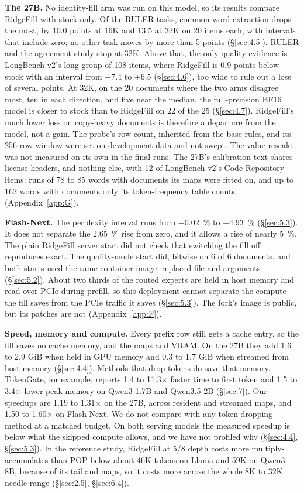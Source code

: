 \documentclass[11pt]{article}
\begin{document}
\textbf{The 27B.} No identity-fill arm was run on this model, so its results compare RidgeFill with stock only. Of the RULER tasks, common-word extraction drops the most, by 10.0 points at 16K and 13.5 at 32K on 20 items each, with intervals that include zero; no other task moves by more than 5 points (\S\ref{sec:4.5}). RULER and the agreement study stop at 32K. Above that, the only quality evidence is LongBench v2's long group of 108 items, where RidgeFill is 0.9 points below stock with an interval from $-$7.4 to +6.5 (\S\ref{sec:4.6}), too wide to rule out a loss of several points. At 32K, on the 20 documents where the two arms disagree most, ten in each direction, and five near the median, the full-precision BF16 model is closer to stock than to RidgeFill on 22 of the 25 (\S\ref{sec:4.7}). RidgeFill's much lower loss on copy-heavy documents is therefore a departure from the model, not a gain. The probe's row count, inherited from the base rules, and its 256-row window were set on development data and not swept. The value rescale was not measured on its own in the final runs. The 27B's calibration text shares license headers, and nothing else, with 12 of LongBench v2's Code Repository items: runs of 78 to 85 words with documents its maps were fitted on, and up to 162 words with documents only its token-frequency table counts (Appendix~\ref{app:G}).

\textbf{Flash-Next.} The perplexity interval runs from $-$0.02~\% to +4.93~\% (\S\ref{sec:5.3}). It does not separate the 2.65~\% rise from zero, and it allows a rise of nearly 5~\%. The plain RidgeFill server start did not check that switching the fill off reproduces exact. The quality-mode start did, bitwise on 6 of 6 documents, and both starts used the same container image, replaced file and arguments (\S\ref{sec:5.2}). About two thirds of the routed experts are held in host memory and read over PCIe during prefill, so this deployment cannot separate the compute the fill saves from the PCIe traffic it saves (\S\ref{sec:5.3}). The fork's image is public, but its patches are not (Appendix~\ref{app:F}).

\textbf{Speed, memory and compute.} Every prefix row still gets a cache entry, so the fill saves no cache memory, and the maps add VRAM. On the 27B they add 1.6 to 2.9 GiB when held in GPU memory and 0.3 to 1.7 GiB when streamed from host memory (\S\ref{sec:4.4}). Methods that drop tokens do save that memory. TokenGate, for example, reports 1.4 to 11.3$\times$ faster time to first token and 1.5 to 3.4$\times$ lower peak memory on Qwen3-1.7B and Qwen3.5-2B (\S\ref{sec:7}). Our speedups are 1.19 to 1.31$\times$ on the 27B, across resident and streamed maps, and 1.50 to 1.60$\times$ on Flash-Next. We do not compare with any token-dropping method at a matched budget. On both serving models the measured speedup is below what the skipped compute allows, and we have not profiled why (\S\ref{sec:4.4}, \S\ref{sec:5.3}). In the reference study, RidgeFill at 5/8 depth costs more multiply-accumulates than POP below about 46K tokens on Llama and 59K on Qwen3-8B, because of its tail and maps, so it costs more across the whole 8K to 32K needle range (\S\ref{sec:2.5}, \S\ref{sec:6.4}).
\end{document}
